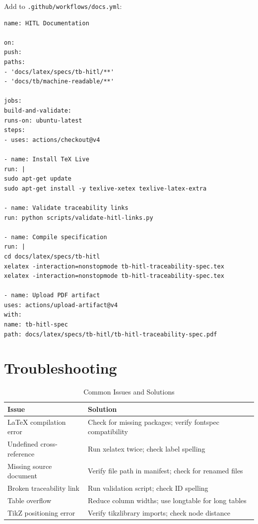 \documentclass[11pt,a4paper,twoside]{report}
\begin{document}
Add to \texttt{.github/workflows/docs.yml}:

\begin{lstlisting}[language=yamlx,basicstyle=\ttfamily\small]
name: HITL Documentation

on:
push:
paths:
- 'docs/latex/specs/tb-hitl/**'
- 'docs/tb/machine-readable/**'

jobs:
build-and-validate:
runs-on: ubuntu-latest
steps:
- uses: actions/checkout@v4

- name: Install TeX Live
run: |
sudo apt-get update
sudo apt-get install -y texlive-xetex texlive-latex-extra

- name: Validate traceability links
run: python scripts/validate-hitl-links.py

- name: Compile specification
run: |
cd docs/latex/specs/tb-hitl
xelatex -interaction=nonstopmode tb-hitl-traceability-spec.tex
xelatex -interaction=nonstopmode tb-hitl-traceability-spec.tex

- name: Upload PDF artifact
uses: actions/upload-artifact@v4
with:
name: tb-hitl-spec
path: docs/latex/specs/tb-hitl/tb-hitl-traceability-spec.pdf
\end{lstlisting}

\section{Troubleshooting}
\label{sec:troubleshooting}

\begin{table}[h]
\centering
\caption{Common Issues and Solutions}
\begin{tabularx}{\textwidth}{@{}L{5cm}L{8.5cm}@{}}
\toprule
\textbf{Issue} & \textbf{Solution} \\
\midrule
LaTeX compilation error & Check for missing packages; verify fontspec compatibility \\
Undefined cross-reference & Run xelatex twice; check label spelling \\
Missing source document & Verify file path in manifest; check for renamed files \\
Broken traceability link & Run validation script; check ID spelling \\
Table overflow & Reduce column widths; use longtable for long tables \\
TikZ positioning error & Verify tikzlibrary imports; check node distance \\
\bottomrule
\end{tabularx}
\end{table}
\end{document}
